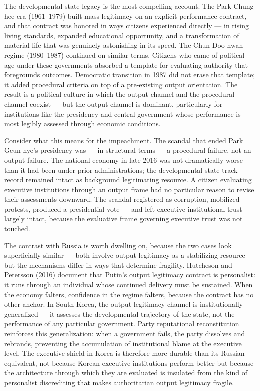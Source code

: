 \documentclass[
  12pt,
  letterpaper]{article}
\begin{document}
The developmental state legacy is the most compelling account. The Park
Chung-hee era (1961--1979) built mass legitimacy on an explicit
performance contract, and that contract was honored in ways citizens
experienced directly --- in rising living standards, expanded
educational opportunity, and a transformation of material life that was
genuinely astonishing in its speed. The Chun Doo-hwan regime
(1980--1987) continued on similar terms. Citizens who came of political
age under these governments absorbed a template for evaluating authority
that foregrounds outcomes. Democratic transition in 1987 did not erase
that template; it added procedural criteria on top of a pre-existing
output orientation. The result is a political culture in which the
output channel and the procedural channel coexist --- but the output
channel is dominant, particularly for institutions like the presidency
and central government whose performance is most legibly assessed
through economic conditions.

Consider what this means for the impeachment. The scandal that ended
Park Geun-hye's presidency was --- in structural terms --- a procedural
failure, not an output failure. The national economy in late 2016 was
not dramatically worse than it had been under prior administrations; the
developmental state track record remained intact as background
legitimating resource. A citizen evaluating executive institutions
through an output frame had no particular reason to revise their
assessments downward. The scandal registered as corruption, mobilized
protests, produced a presidential vote --- and left executive
institutional trust largely intact, because the evaluative frame
governing executive trust was not touched.

The contrast with Russia is worth dwelling on, because the two cases
look superficially similar --- both involve output legitimacy as a
stabilizing resource --- but the mechanisms differ in ways that
determine fragility. Hutcheson and Petersson (2016) document that
Putin's output legitimacy contract is personalist: it runs through an
individual whose continued delivery must be sustained. When the economy
falters, confidence in the regime falters, because the contract has no
other anchor. In South Korea, the output legitimacy channel is
institutionally generalized --- it assesses the developmental trajectory
of the state, not the performance of any particular government. Party
reputational reconstitution reinforces this generalization: when a
government fails, the party dissolves and rebrands, preventing the
accumulation of institutional blame at the executive level. The
executive shield in Korea is therefore more durable than its Russian
equivalent, not because Korean executive institutions perform better but
because the architecture through which they are evaluated is insulated
from the kind of personalist discrediting that makes authoritarian
output legitimacy fragile.
\end{document}
